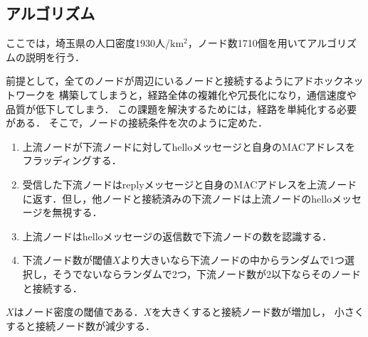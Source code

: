 \documentclass[a4paper, 11pt]{ltjsarticle}
\begin{document}


\clearpage
\subsection{アルゴリズム}
ここでは，埼玉県の人口密度1930人/$\mathrm{km^2}$，ノード数1710個を用いてアルゴリズムの説明を行う．

前提として，全てのノードが周辺にいるノードと接続するようにアドホックネットワークを
構築してしまうと，経路全体の複雑化や冗長化になり，通信速度や品質が低下してしまう．
この課題を解決するためには，経路を単純化する必要がある．
そこで，ノードの接続条件を次のように定めた．

\begin{enumerate}[label=\ding{\numexpr171+\arabic*}]
  \item \label{2-1} 上流ノードが下流ノードに対してhelloメッセージと自身のMACアドレスをフラッディングする．
  \item \label{2-2} 受信した下流ノードはreplyメッセージと自身のMACアドレスを上流ノードに返す．但し，他ノードと接続済みの下流ノードは上流ノードのhelloメッセージを無視する．
  \item \label{2-3} 上流ノードはhelloメッセージの返信数で下流ノードの数を認識する．
  \item \label{2-4} 下流ノード数が閾値$X$より大きいなら下流ノードの中からランダムで1つ選択し，そうでないならランダムで2つ，下流ノード数が2以下ならそのノードと接続する．
\end{enumerate}
$X$はノード密度の閾値である．$X$を大きくすると接続ノード数が増加し，
小さくすると接続ノード数が減少する．
\end{document}
